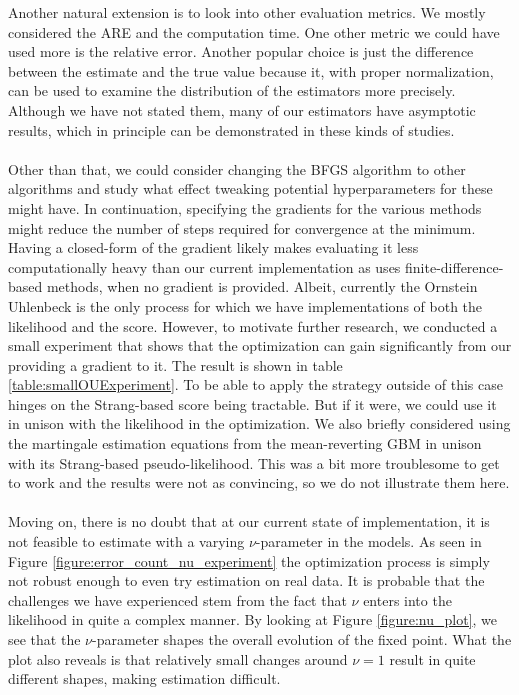 Another natural extension is to look into other evaluation metrics. We mostly considered the ARE and the computation time. One other metric we could have used more is the relative error. Another popular choice is just the difference between the estimate and the true value because it, with proper normalization, can be used to examine the distribution of the estimators more precisely. Although we have not stated them, many of our estimators have asymptotic results, which in principle can be demonstrated in these kinds of studies.\\\\
Other than that, we could consider changing the BFGS algorithm to other algorithms and study what effect tweaking potential hyperparameters for these might have. In continuation, specifying the gradients for the various methods might reduce the number of steps required for convergence at the minimum. Having a closed-form of the gradient likely makes evaluating it less computationally heavy than our current implementation as  uses finite-difference-based methods, when no gradient is provided. Albeit, currently the Ornstein Uhlenbeck is the only process for which we have implementations of both the likelihood and the score. However, to motivate further research, we conducted a small experiment that shows that the optimization can gain significantly from our providing a gradient to it. The result is shown in table \ref{table:smallOUExperiment}. To be able to apply the strategy outside of this case hinges on the Strang-based score being tractable. But if it were, we could use it in unison with the likelihood in the optimization. We also briefly considered using the martingale estimation equations from the mean-reverting GBM in unison with its Strang-based pseudo-likelihood. This was a bit more troublesome to get to work and the results were not as convincing, so we do not illustrate them here.  \\\\
Moving on, there is no doubt that at our current state of implementation, it is not feasible to estimate with a varying $\nu$-parameter in the models. As seen in Figure \ref{figure:error_count_nu_experiment} the optimization process is simply not robust enough to even try estimation on real data. It is probable that the challenges we have experienced stem from the fact that $\nu$ enters into the likelihood in quite a complex manner. By looking at Figure \ref{figure:nu_plot}, we see that the $\nu$-parameter shapes the overall evolution of the fixed point. What the plot also reveals is that relatively small changes around $\nu = 1$ result in quite different shapes, making estimation difficult.
 
